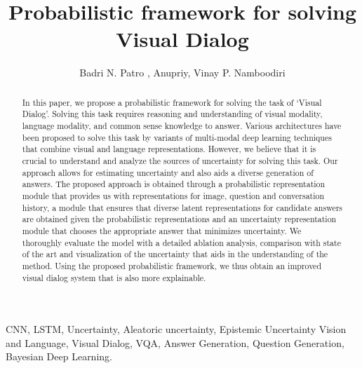 \documentclass[review]{elsarticle}
\begin{document}
\begin{frontmatter}

\title{Probabilistic framework for solving Visual Dialog}


\author{Badri N. Patro , Anupriy, Vinay P. Namboodiri}
\address{ Department of Electrical Engineering, Indian Institute of Technology Kanpur, India\\  Department of Computer Science and Engineering, Indian Institute of Technology Kanpur, India }







\begin{abstract}
	In this paper, we propose a probabilistic framework for solving the task of `Visual Dialog'. Solving this task requires reasoning and understanding of visual modality, language modality, and common sense knowledge to answer. Various architectures have been proposed to solve this task by variants of multi-modal deep learning techniques that combine visual and language representations. However, we believe that it is crucial to understand and analyze the sources of uncertainty for solving this task. Our approach allows for estimating uncertainty and also aids a diverse generation of answers. The proposed approach is obtained through a probabilistic representation module that provides us with representations for image, question and conversation history, a module that ensures that diverse latent representations for candidate answers are obtained given the probabilistic representations and an uncertainty representation module that chooses the appropriate answer that minimizes uncertainty. We thoroughly evaluate the model with a detailed ablation analysis, comparison with state of the art and visualization of the uncertainty that aids in the understanding of the method. Using the proposed probabilistic framework, we thus obtain an improved visual dialog system that is also more explainable.
	
	




	


	
\end{abstract}

\begin{keyword}
	CNN, LSTM, Uncertainty, Aleatoric uncertainty, Epistemic Uncertainty Vision and Language, Visual Dialog, VQA, Answer Generation, Question Generation, Bayesian Deep Learning.
\end{keyword}

\end{frontmatter}
\end{document}
